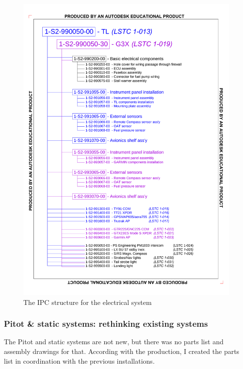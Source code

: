 \documentclass[11pt,a4paper]{article}
\begin{document}
\begin{figure}[ht!]
	\begin{center}
		\includegraphics[width=15cm,trim = 1.9cm 2.4cm 1.9cm 2.4cm, clip]{pics/PIC015.pdf}
		\caption{The IPC structure for the electrical system}
		\label{fig:PIC015}
	\end{center}
\end{figure}

\newpage

\subsubsection{Pitot \& static systems: rethinking existing systems}

The Pitot and static systems are not new, but there was no parts list and assembly drawings for that. According with the production, I created the parts list in coordination with the previous installations.
\end{document}
